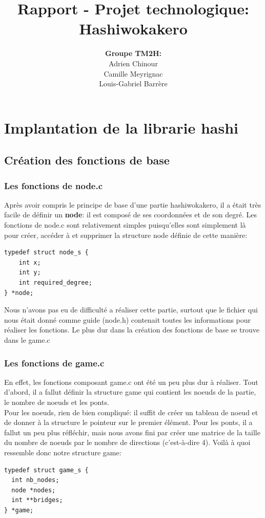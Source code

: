 \documentclass[12pt]{report}
\title{\textbf{Rapport - Projet technologique:\\Hashiwokakero}}
\author{\textbf{Groupe TM2H:}\\Adrien Chinour\\ Camille Meyrignac\\ Louis-Gabriel Barrère}
\begin{document}
\maketitle

\tableofcontents

\chapter{Implantation de la librarie hashi}

\section{Création des fonctions de base}

\subsection{Les fonctions de node.c}
\textnormal{Après avoir compris le principe de base d'une partie hashiwokakero, il a était très facile de définir un \textbf{node}: il est composé de ses coordonnées et de son degré. Les fonctions de node.c sont relativement simples puisqu'elles sont simplement là pour créer, accéder à et supprimer la structure node définie de cette manière:}
\begin{verbatim}
typedef struct node_s {
	int x;
	int y;
	int required_degree;
} *node;
\end{verbatim}

\textnormal{Nous n'avons pas eu de difficulté a réaliser cette partie, surtout que le fichier qui nous était donné comme guide (node.h) contenait toutes les informations pour réaliser les fonctions. Le plus dur dans la création des fonctions de base se trouve dans le game.c}

\newpage

\subsection{Les fonctions de game.c}
\textnormal{En effet, les fonctions composant game.c ont été un peu plus dur à réaliser. Tout d'abord, il a fallut définir la structure game qui contient les noeuds de la partie, le nombre de noeuds et les ponts.\\ Pour les noeuds, rien de bien compliqué: il suffit de créer un tableau de noeud et de donner à la structure le pointeur sur le premier élément. Pour les ponts, il a fallut un peu plus réfléchir, mais nous avons fini par créer une matrice de la taille du nombre de noeuds par le nombre de directions (c'est-à-dire 4). Voilà à quoi ressemble donc notre structure game:}
\begin{verbatim}
typedef struct game_s {
  int nb_nodes;
  node *nodes;
  int **bridges;
} *game;
\end{verbatim}
\end{document}
